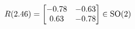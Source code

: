 \documentclass[preview]{standalone}
\begin{document}
\begin{align*}
\special{dvisvgm:raw <g id='unique000'>}R(2.46) = \begin{bmatrix} -0.78 & -0.63 \\ 0.63 & -0.78 \end{bmatrix} \in \text{SO}(2)\special{dvisvgm:raw </g>}
\end{align*}
\end{document}
